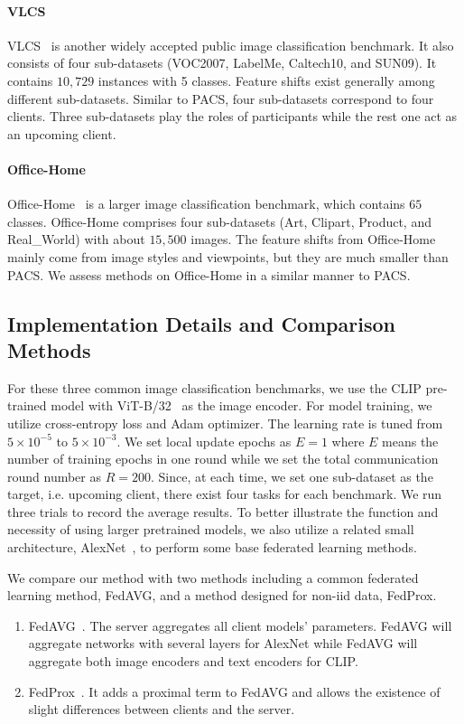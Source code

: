 \documentclass[11pt]{article}
\begin{document}
\paragraph{VLCS} VLCS~\cite{fang2013unbiased} is another widely accepted public image classification benchmark.
It also consists of four sub-datasets (VOC2007, LabelMe, Caltech10, and SUN09).
It contains $10,729$ instances with 5 classes.
Feature shifts exist generally among different sub-datasets.
Similar to PACS, four sub-datasets correspond to four clients.
Three sub-datasets play the roles of participants while the rest one act as an upcoming client.

\paragraph{Office-Home} Office-Home~\cite{venkateswara2017deep} is a larger image classification benchmark, which contains $65$ classes.
Office-Home comprises four sub-datasets (Art, Clipart, Product, and Real\_World) with about $15,500$ images.
The feature shifts from Office-Home mainly come from image styles and viewpoints, but they are much smaller than PACS.
We assess methods on Office-Home in a similar manner to PACS.

\subsection{Implementation Details and Comparison Methods}
For these three common image classification benchmarks, we use the CLIP pre-trained model with ViT-B/32~\cite{dosovitskiyimage} as the image encoder.
For model training, we utilize cross-entropy loss and Adam optimizer.
The learning rate is tuned from $5\times 10^{-5}$ to $5\times 10^{-3}$.
We set local update epochs as $E=1$ where $E$ means the number of training epochs in one round while we set the total communication round number as $R=200$.
Since, at each time, we set one sub-dataset as the target, i.e. upcoming client, there exist four tasks for each benchmark.
We run three trials to record the average results.
To better illustrate the function and necessity of using larger pretrained models, we also utilize a related small architecture, AlexNet~\cite{krizhevsky2012imagenet}, to perform some base federated learning methods.

We compare our method with two methods including a common federated learning method, FedAVG, and a method designed for non-iid data, FedProx.
\begin{enumerate}
    \item FedAVG~\cite{mcmahan2017communication}. The server aggregates all client models' parameters. FedAVG will aggregate networks with several layers for AlexNet while FedAVG will aggregate both image encoders and text encoders for CLIP.
    \item FedProx~\cite{li2018federated}. It adds a proximal term to FedAVG and allows the existence of slight differences between clients and the server.
\end{enumerate}
\end{document}
